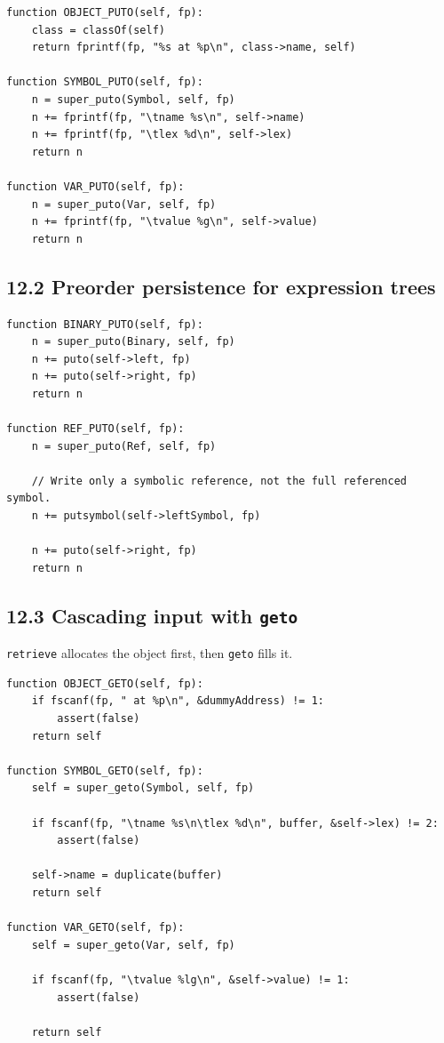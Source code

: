 \documentclass[11pt]{article}
\begin{document}
\begin{verbatim}
function OBJECT_PUTO(self, fp):
    class = classOf(self)
    return fprintf(fp, "%s at %p\n", class->name, self)

function SYMBOL_PUTO(self, fp):
    n = super_puto(Symbol, self, fp)
    n += fprintf(fp, "\tname %s\n", self->name)
    n += fprintf(fp, "\tlex %d\n", self->lex)
    return n

function VAR_PUTO(self, fp):
    n = super_puto(Var, self, fp)
    n += fprintf(fp, "\tvalue %g\n", self->value)
    return n
\end{verbatim}

\subsection{12.2 Preorder persistence for expression
trees}\label{preorder-persistence-for-expression-trees}

\begin{verbatim}
function BINARY_PUTO(self, fp):
    n = super_puto(Binary, self, fp)
    n += puto(self->left, fp)
    n += puto(self->right, fp)
    return n

function REF_PUTO(self, fp):
    n = super_puto(Ref, self, fp)

    // Write only a symbolic reference, not the full referenced symbol.
    n += putsymbol(self->leftSymbol, fp)

    n += puto(self->right, fp)
    return n
\end{verbatim}

\subsection{\texorpdfstring{12.3 Cascading input with
\texttt{geto}}{12.3 Cascading input with geto}}\label{cascading-input-with-geto}

\texttt{retrieve} allocates the object first, then
\texttt{geto} fills it.

\begin{verbatim}
function OBJECT_GETO(self, fp):
    if fscanf(fp, " at %p\n", &dummyAddress) != 1:
        assert(false)
    return self

function SYMBOL_GETO(self, fp):
    self = super_geto(Symbol, self, fp)

    if fscanf(fp, "\tname %s\n\tlex %d\n", buffer, &self->lex) != 2:
        assert(false)

    self->name = duplicate(buffer)
    return self

function VAR_GETO(self, fp):
    self = super_geto(Var, self, fp)

    if fscanf(fp, "\tvalue %lg\n", &self->value) != 1:
        assert(false)

    return self
\end{verbatim}
\end{document}
